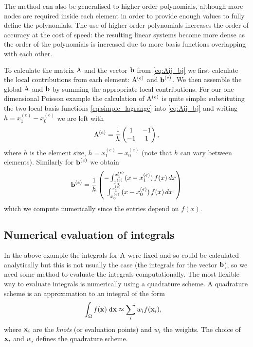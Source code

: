 {The method can also be generalised to higher order polynomials, although more nodes are required inside each element in order to provide enough values to fully define the polynomials.
The use of higher order polynomials increases the order of accuracy at the cost of speed: the resulting linear systems become more dense as the order of the polynomials is increased due to more basis functions overlapping with each other.

To calculate the matrix $\mathrm{A}$ and the vector ${\boldsymbol{\mathrm{b}}}$ from \cref{eq:Aij_bj} we first calculate the local contributions from each element: $\mathrm{A}^{(e)}$ and ${\boldsymbol{\mathrm{b}}}^{(e)}$.
We then assemble the global $\mathrm{A}$ and ${\boldsymbol{\mathrm{b}}}$ by summing the appropriate local contributions.
For our one-dimensional Poisson example the calculation of $\mathrm{A}^{(e)}$ is quite
simple: substituting the two local basis functions \cref{eq:simple_lagrange} into
\cref{eq:Aij_bj} and writing $h=x_{1}^{(e)} - x_{0}^{(e)}$ we are left with
\begin{equation}
  \mathrm{A}^{(e)} = \frac{1}{h}
    \begin{pmatrix}
      1 & -1 \\
      -1 & 1
    \end{pmatrix},
\end{equation}
where $h$ is the element size, $h = x_{1}^{(e)}-x_{0}^{(e)}$ (note that $h$ can vary between elements).
Similarly for ${\boldsymbol{\mathrm{b}}}^{(e)}$ we obtain
\begin{equation}
  {\boldsymbol{\mathrm{b}}}^{(e)}=\frac{1}{h}
    \begin{pmatrix}
      -\int_{x_{0}^{(e)}}^{x_{1}^{(e)}}(x-x_{1}^{(e)})\, f(x)\, dx\\
      \int_{x_{0}^{(e)}}^{x_{1}^{(e)}}(x-x_{0}^{(e)})\, f(x)\, dx
    \end{pmatrix}
\end{equation}
which we compute numerically since the entries depend on $f(x)$.



\subsection{Numerical evaluation of integrals}
\label{sec:numer-eval-integrals}

In the above example the integrals for $\mathrm{A}$ were fixed and so could be calculated analytically but this is not usually the case (\eg the integrals for the vector ${\boldsymbol{\mathrm{b}}}$), so we need some method to evaluate the integrals computationally.
The most flexible way to evaluate integrals is numerically using a quadrature scheme.
A quadrature scheme is an approximation to an integral of the form
\begin{equation}
  \begin{aligned}
    {\int_{\Omega} {f(\boldsymbol{\mathrm{x}})} {\; \mathrm{{d}}}\boldsymbol{\mathrm{x}}} &\approx  \sum_i w_i f(\boldsymbol{\mathrm{x}}_i),
  \end{aligned}
\end{equation}
where $\boldsymbol{\mathrm{x}}_i$ are the \emph{knots} (or evaluation points) and $w_i$ the weights.
The choice of $\boldsymbol{\mathrm{x}}_i$ and $w_i$ defines the quadrature scheme.

}
